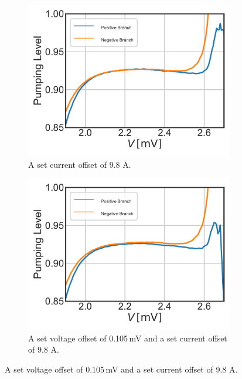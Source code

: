 \documentclass[]{article}
\begin{document}
\begin{figure}
	\centering              
	\begin{subfigure}[t]{0.49\textwidth}
		\centering
		\includegraphics[width=\linewidth]{./../Mixer_Unit_Test/2020_01_16_IVOffsetFixedMask_9.8uA/Pumping_Level_Zoom.pdf}
		\caption{A set current offset of 9.8 \textmu A.}
	\end{subfigure}
	\begin{subfigure}[t]{0.49\textwidth}
		\centering
		\includegraphics[width=\linewidth]{./../Mixer_Unit_Test/2020_01_16_IVOffsetFixedMask_0.105mV9.8uA/Pumping_Level_Zoom.pdf}
		\caption{A set voltage offset of 0.105\,mV and a set current offset of 9.8 \textmu A.}
	\end{subfigure}

\end{figure}
\end{document}
